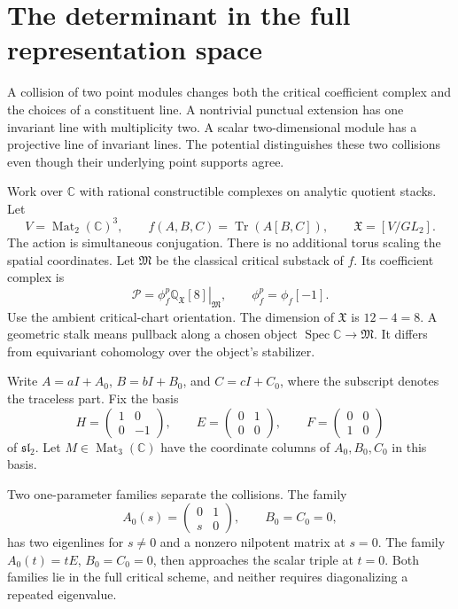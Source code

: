 \section{The determinant in the full representation space}
\label{sec:c3-collision-determinant}

A collision of two point modules changes both the critical coefficient
complex and the choices of a constituent line. A nontrivial punctual
extension has one invariant line with multiplicity two. A scalar
two-dimensional module has a projective line of invariant lines.
The potential distinguishes these two collisions even though their
underlying point supports agree.

Work over $\mathbb C$ with rational constructible complexes on analytic
quotient stacks. Let
\[
 V=\operatorname{Mat}_2(\mathbb C)^3,\qquad
 f(A,B,C)=\operatorname{Tr}(A[B,C]),\qquad
 \mathfrak X=[V/GL_2].
\]
The action is simultaneous conjugation. There is no additional torus
scaling the spatial coordinates. Let $\mathfrak M$ be the classical
critical substack of $f$. Its coefficient complex is
\[
 \mathcal P=\left.\phi_f^p\mathbb Q_{\mathfrak X}[8]
 \right|_{\mathfrak M},\qquad \phi_f^p=\phi_f[-1].
\]
Use the ambient critical-chart orientation. The dimension of
$\mathfrak X$ is $12-4=8$. A geometric stalk means pullback along a
chosen object $\operatorname{Spec}\mathbb C\to\mathfrak M$.
It differs from equivariant cohomology over the object's stabilizer.

Write $A=aI+A_0$, $B=bI+B_0$, and $C=cI+C_0$, where the subscript
denotes the traceless part. Fix the basis
\[
 H=\begin{pmatrix}1&0\\0&-1\end{pmatrix},\qquad
 E=\begin{pmatrix}0&1\\0&0\end{pmatrix},\qquad
 F=\begin{pmatrix}0&0\\1&0\end{pmatrix}
\]
of $\mathfrak{sl}_2$. Let $M\in\operatorname{Mat}_3(\mathbb C)$ have
the coordinate columns of $A_0,B_0,C_0$ in this basis.

Two one-parameter families separate the collisions. The family
\[
 A_0(s)=\begin{pmatrix}0&1\\s&0\end{pmatrix},\qquad B_0=C_0=0,
\]
has two eigenlines for $s\ne0$ and a nonzero nilpotent matrix at
$s=0$. The family $A_0(t)=tE$, $B_0=C_0=0$, then approaches the
scalar triple at $t=0$. Both families lie in the full critical
scheme, and neither requires diagonalizing a repeated eigenvalue.

